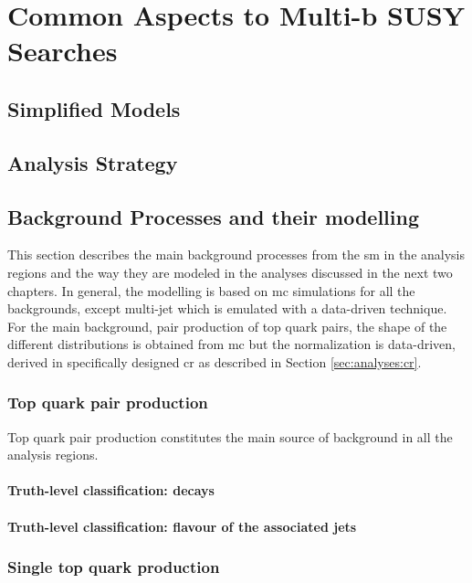 \chapter{Common Aspects to Multi-b SUSY Searches}
\label{chap:multib_general}

\section{Simplified Models}

\section{Analysis Strategy}

\section{Background Processes and their modelling}

This section describes the main background processes from the \gls{sm} in the analysis regions and the way they are 
modeled in the analyses discussed in the next two chapters. In general, the modelling is based on \gls{mc} simulations for
all the backgrounds, except multi-jet which is emulated with a data-driven technique.
For the main background, pair production of top quark pairs, the shape of the different distributions is obtained from \gls{mc}
but the normalization is data-driven, derived in specifically designed \gls{cr} as described in Section \ref{sec:analyses:cr}.

\subsection{Top quark pair production}

Top quark pair production constitutes the main source of background in all the analysis regions. 

\subsubsection{Truth-level classification: \ttbar decays}

\subsubsection{Truth-level classification: flavour of the associated jets}

\subsection{Single top quark production}

